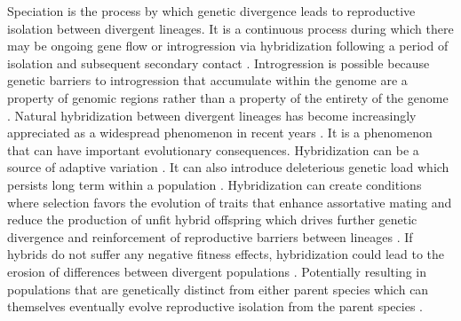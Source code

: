 

Speciation is the process by which genetic divergence leads to reproductive  
isolation between divergent lineages.
It is a continuous process during which there may be ongoing gene flow or 
introgression via hybridization following a period of isolation and subsequent
secondary contact \parencite{mallet2008,wu2001}.
Introgression is possible because genetic barriers to introgression that accumulate 
within the genome are a property of genomic regions rather than a property of the 
entirety of the genome \parencite{wu2001,gompert2012b}.
Natural hybridization between divergent lineages has become increasingly 
appreciated as a widespread phenomenon in recent years \parencite{mallet2005,moran2021}.
It is a phenomenon that can have important evolutionary consequences.
Hybridization can be a source of adaptive variation \parencite{hedrick2013}. 
It can also introduce deleterious genetic load which persists long term 
within a population \parencite{moran2021}. %
Hybridization can create conditions where selection favors the evolution of traits 
that enhance assortative mating and reduce the production of unfit hybrid offspring
which drives further genetic divergence and reinforcement of reproductive barriers
between lineages \parencite{servedio2003}.
If hybrids do not suffer any negative fitness effects, hybridization could lead to 
the erosion of differences between divergent populations \parencite{taylor2006}.
Potentially resulting in populations that are genetically distinct from either 
parent species which can themselves eventually evolve reproductive isolation from 
the parent species \parencite{moran2021}.

